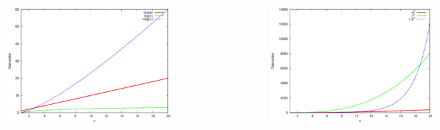 \documentclass[aspectratio=169]{beamer}
\begin{document}
\begin{frame}
\begin{columns}[T]
\begin{column}{0.5\linewidth}
	\begin{figure}[h]
		\centering
		\includegraphics[height=0.6\paperheight]{pucrs-ec-poo-unidade_01-complexidade_de_algoritmos-laminas-grafico4.png}
	\end{figure}
\end{column}
\begin{column}{0.5\linewidth}
	\begin{figure}[h]
		\centering
		\includegraphics[height=0.6\paperheight]{pucrs-ec-poo-unidade_01-complexidade_de_algoritmos-laminas-grafico5.png}
	\end{figure}
\end{column}
\end{columns}

\end{frame}
\end{document}
